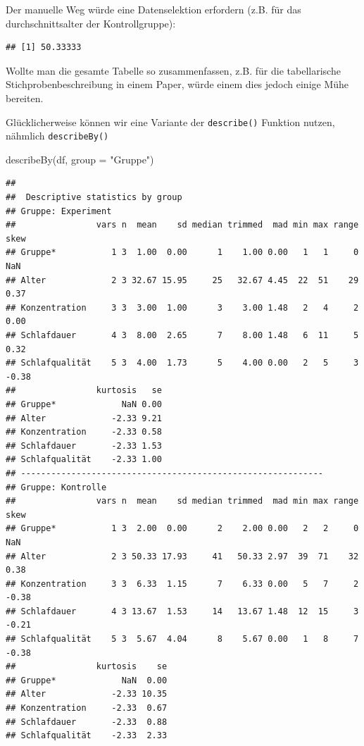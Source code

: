 \documentclass[
]{book}
\newenvironment{Shaded}{\begin{snugshade}}{\end{snugshade}}
\newcommand{\AttributeTok}[1]{\textcolor[rgb]{0.77,0.63,0.00}{#1}}
\newcommand{\FunctionTok}[1]{\textcolor[rgb]{0.00,0.00,0.00}{#1}}
\newcommand{\NormalTok}[1]{#1}
\newcommand{\SpecialCharTok}[1]{\textcolor[rgb]{0.00,0.00,0.00}{#1}}
\newcommand{\StringTok}[1]{\textcolor[rgb]{0.31,0.60,0.02}{#1}}
\begin{document}
Der manuelle Weg würde eine Datenselektion erfordern (z.B. für das durchschnittsalter der Kontrollgruppe):

\begin{Shaded}
\end{Shaded}

\begin{verbatim}
## [1] 50.33333
\end{verbatim}

Wollte man die gesamte Tabelle so zusammenfassen, z.B. für die tabellarische Stichprobenbeschreibung in einem Paper, würde einem dies jedoch einige Mühe bereiten.

Glücklicherweise können wir eine Variante der \texttt{describe()} Funktion nutzen, nähmlich \texttt{describeBy()}

\begin{Shaded}
\begin{Highlighting}[]
\FunctionTok{describeBy}\NormalTok{(df, }\AttributeTok{group =} \StringTok{"Gruppe"}\NormalTok{)}
\end{Highlighting}
\end{Shaded}

\begin{verbatim}
## 
##  Descriptive statistics by group 
## Gruppe: Experiment
##                vars n  mean    sd median trimmed  mad min max range  skew
## Gruppe*           1 3  1.00  0.00      1    1.00 0.00   1   1     0   NaN
## Alter             2 3 32.67 15.95     25   32.67 4.45  22  51    29  0.37
## Konzentration     3 3  3.00  1.00      3    3.00 1.48   2   4     2  0.00
## Schlafdauer       4 3  8.00  2.65      7    8.00 1.48   6  11     5  0.32
## Schlafqualität    5 3  4.00  1.73      5    4.00 0.00   2   5     3 -0.38
##                kurtosis   se
## Gruppe*             NaN 0.00
## Alter             -2.33 9.21
## Konzentration     -2.33 0.58
## Schlafdauer       -2.33 1.53
## Schlafqualität    -2.33 1.00
## ------------------------------------------------------------ 
## Gruppe: Kontrolle
##                vars n  mean    sd median trimmed  mad min max range  skew
## Gruppe*           1 3  2.00  0.00      2    2.00 0.00   2   2     0   NaN
## Alter             2 3 50.33 17.93     41   50.33 2.97  39  71    32  0.38
## Konzentration     3 3  6.33  1.15      7    6.33 0.00   5   7     2 -0.38
## Schlafdauer       4 3 13.67  1.53     14   13.67 1.48  12  15     3 -0.21
## Schlafqualität    5 3  5.67  4.04      8    5.67 0.00   1   8     7 -0.38
##                kurtosis    se
## Gruppe*             NaN  0.00
## Alter             -2.33 10.35
## Konzentration     -2.33  0.67
## Schlafdauer       -2.33  0.88
## Schlafqualität    -2.33  2.33
\end{verbatim}
\end{document}
